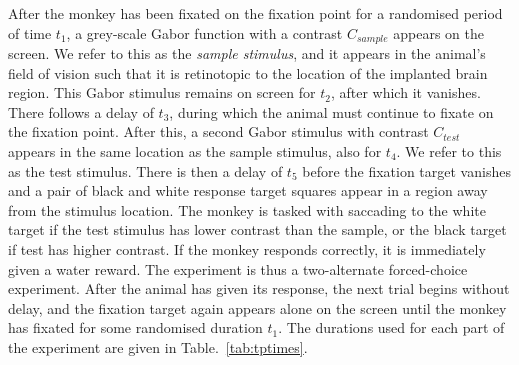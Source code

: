 After the monkey has been fixated on the fixation point for a randomised period of time
$t_1$,
a grey-scale Gabor function with a contrast $C_{sample}$ appears on the screen. We refer to this as the \textit{sample stimulus}, and it appears in the animal's field of vision such that it is retinotopic to the location of the implanted brain region.
This Gabor stimulus remains on screen for $t_2$, after which it vanishes.
There follows a delay of $t_3$, during which the animal must continue to fixate on the fixation point.
After this, a second Gabor stimulus with contrast $C_{test}$ appears in the same location as the sample stimulus, also for $t_4$. We refer to this as the test stimulus.
There is then a delay of $t_5$ before the fixation target vanishes and a pair of black and white response target squares appear in a region away from the stimulus location. The monkey is tasked with saccading to the white target if the test stimulus has lower contrast than the sample, or the black target if test has higher contrast. If the monkey responds correctly, it is immediately given a water reward. The experiment is thus a two-alternate forced-choice experiment.
After the animal has given its response, the next trial begins without delay, and the fixation target again appears alone on the screen until the monkey has fixated for some randomised duration $t_1$.
The durations used for each part of the experiment are given in Table.~\ref{tab:tptimes}.

